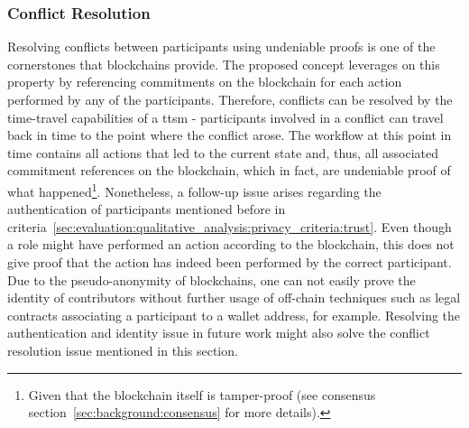 \subsubsection{Conflict Resolution}
\label{sec:evaluation:qualitative_analysis:privacy_criteria:conflict_resolution}
Resolving conflicts between participants using undeniable proofs is one of the cornerstones that blockchains provide. The proposed concept leverages on this property by referencing commitments on the blockchain for each action performed by any of the participants. Therefore, conflicts can be resolved by the time-travel capabilities of a \gls{ttsm} - participants involved in a conflict can travel back in time to the point where the conflict arose. The workflow at this point in time contains all actions that led to the current state and, thus, all associated commitment references on the blockchain, which in fact, are undeniable proof of what happened\footnote{Given that the blockchain itself is tamper-proof (see consensus section~\ref{sec:background:consensus} for more details).}. Nonetheless, a follow-up issue arises regarding the authentication of participants mentioned before in criteria~\ref{sec:evaluation:qualitative_analysis:privacy_criteria:trust}. Even though a role might have performed an action according to the blockchain, this does not give proof that the action has indeed been performed by the correct participant. Due to the pseudo-anonymity of blockchains, one can not easily prove the identity of contributors without further usage of off-chain techniques such as legal contracts associating a participant to a wallet address, for example. Resolving the authentication and identity issue in future work might also solve the conflict resolution issue mentioned in this section.


